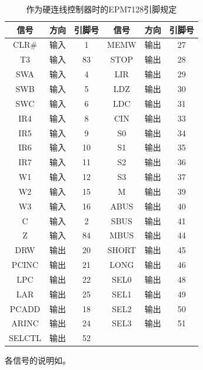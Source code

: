 \documentclass[lang=cn,11pt,a4paper,cite=authornum]{paper}
\begin{document}
\begin{table}[!htbp]
    \centering
    \caption{作为硬连线控制器时的EPM7128引脚规定\label{tab:signal}}
    \begin{tabular}{|c|c|c|c|c|c|}
        \hline
        信号 & 方向 & 引脚号 & 信号 & 方向 & 引脚号 \\ \hline
        CLR\# & 输入 & 1 & MEMW & 输出 & 27 \\ \hline
        T3 & 输入 & 83 & STOP & 输出 & 28 \\ \hline
        SWA & 输入 & 4 & LIR & 输出 & 29 \\ \hline
        SWB & 输入 & 5 & LDZ & 输出 & 30 \\ \hline
        SWC & 输入 & 6 & LDC & 输出 & 31 \\ \hline
        IR4 & 输入 & 8 & CIN & 输出 & 33 \\ \hline
        IR5 & 输入 & 9 & S0 & 输出 & 34 \\ \hline
        IR6 & 输入 & 10 & S1 & 输出 & 35 \\ \hline
        IR7 & 输入 & 11 & S2 & 输出 & 36 \\ \hline
        W1 & 输入 & 12 & S3 & 输出 & 37 \\ \hline
        W2 & 输入 & 15 & M & 输出 & 39 \\ \hline
        W3 & 输入 & 16 & ABUS & 输出 & 40 \\ \hline
        C & 输入 & 2 & SBUS & 输出 & 41 \\ \hline
        Z & 输入 & 84 & MBUS & 输出 & 44 \\ \hline
        DRW & 输出 & 20 & SHORT & 输出 & 45 \\ \hline
        PCINC & 输出 & 21 & LONG & 输出 & 46 \\ \hline
        LPC & 输出 & 22 & SEL0 & 输出 & 48 \\ \hline
        LAR & 输出 & 25 & SEL1 & 输出 & 49 \\ \hline
        PCADD & 输出 & 18 & SEL2 & 输出 & 50 \\ \hline
        ARINC & 输出 & 24 & SEL3 & 输出 & 51 \\ \hline
        SELCTL & 输出 & 52 & & & \\ \hline
    \end{tabular}
\end{table}

各信号的说明如。
\end{document}
